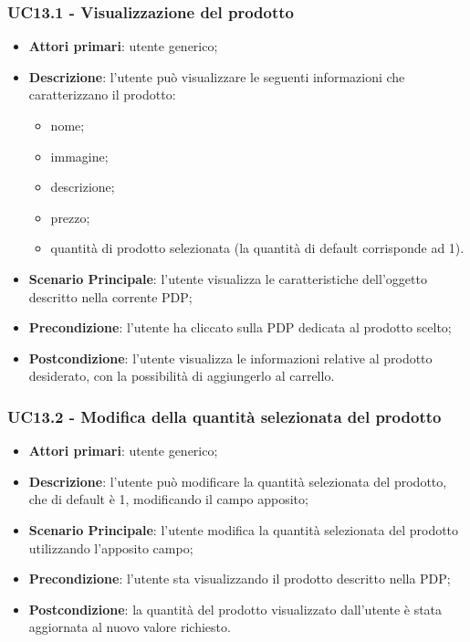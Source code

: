 \subsubsection{UC13.1 - Visualizzazione del prodotto}
\begin{itemize}
\item \textbf{Attori primari}: utente generico;
\item \textbf{Descrizione}: l'utente può visualizzare le seguenti informazioni che caratterizzano il prodotto:
\begin{itemize}
\item nome;
\item immagine;
\item descrizione;
\item prezzo;
\item quantità di prodotto selezionata (la quantità di default corrisponde ad 1).
\end{itemize}
\item \textbf{Scenario Principale}: l'utente visualizza le caratteristiche dell'oggetto descritto nella corrente PDP;
\item \textbf{Precondizione}: l'utente ha cliccato sulla PDP dedicata al prodotto scelto;
\item \textbf{Postcondizione}: l'utente visualizza le informazioni relative al prodotto desiderato, con la possibilità di aggiungerlo al carrello.
\end{itemize}

\subsubsection{UC13.2 - Modifica della quantità selezionata del prodotto}
\begin{itemize}
\item \textbf{Attori primari}: utente generico;
\item \textbf{Descrizione}: l'utente può modificare la quantità selezionata del prodotto, che di default è 1, modificando il campo apposito;
\item \textbf{Scenario Principale}: l'utente modifica la quantità selezionata del prodotto utilizzando l'apposito campo;
\item \textbf{Precondizione}: l'utente sta visualizzando il prodotto descritto nella PDP;
\item \textbf{Postcondizione}: la quantità del prodotto visualizzato dall'utente è stata aggiornata al nuovo valore richiesto.
\end{itemize}

